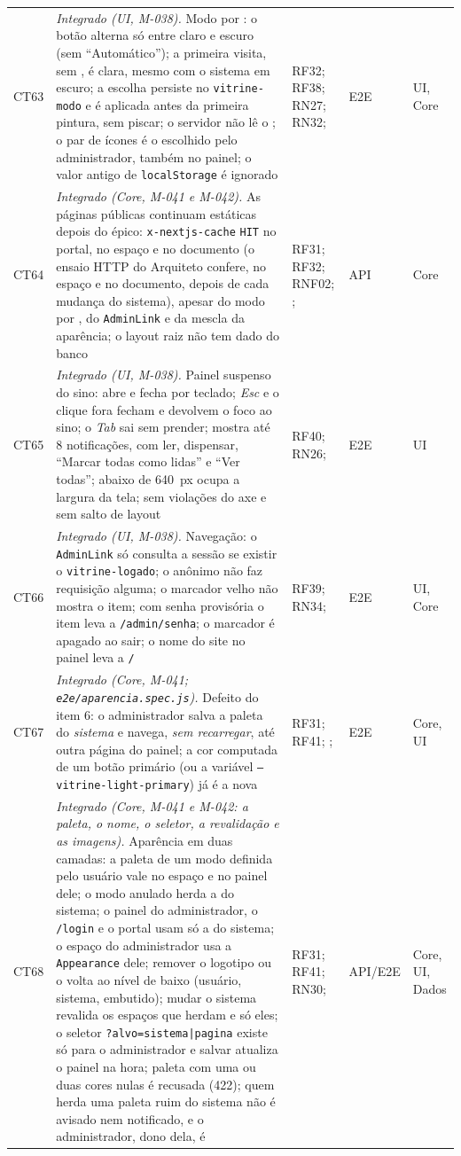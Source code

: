 \begin{longtable}{@{}L{1.1cm}L{7.0cm}L{2.2cm}L{1.6cm}L{1.6cm}@{}}
CT63 & \emph{Integrado (UI, M-038).} Modo por : o botão alterna só entre claro e escuro (sem ``Automático''); a primeira visita, sem , é clara, mesmo com o sistema em escuro; a escolha persiste no \texttt{vitrine-modo} e é aplicada antes da primeira pintura, sem piscar; o servidor não lê o ; o par de ícones é o escolhido pelo administrador, também no painel; o valor antigo de \texttt{localStorage} é ignorado & RF32; RF38; RN27; RN32;  & E2E & UI, Core\\[2pt]
CT64 & \emph{Integrado (Core, M-041 e M-042).} As páginas públicas continuam estáticas depois do épico: \texttt{x-nextjs-cache} \texttt{HIT} no portal, no espaço e no documento (o ensaio HTTP do Arquiteto confere, no espaço e no documento, depois de cada mudança do sistema), apesar do modo por , do \texttt{AdminLink} e da mescla da aparência; o layout raiz não tem dado do banco & RF31; RF32; RNF02; ;  & API & Core\\[2pt]
CT65 & \emph{Integrado (UI, M-038).} Painel suspenso do sino: abre e fecha por teclado; \emph{Esc} e o clique fora fecham e devolvem o foco ao sino; o \emph{Tab} sai sem prender; mostra até 8 notificações, com ler, dispensar, ``Marcar todas como lidas'' e ``Ver todas''; abaixo de 640~px ocupa a largura da tela; sem violações do axe e sem salto de layout & RF40; RN26;  & E2E & UI\\[2pt]
CT66 & \emph{Integrado (UI, M-038).} Navegação: o \texttt{AdminLink} só consulta a sessão se existir o \texttt{vitrine-logado}; o anônimo não faz requisição alguma; o marcador velho não mostra o item; com senha provisória o item leva a \texttt{/admin/senha}; o marcador é apagado ao sair; o nome do site no painel leva a \texttt{/} & RF39; RN34;  & E2E & UI, Core\\[2pt]
CT67 & \emph{Integrado (Core, M-041; \texttt{e2e/aparencia.spec.js}).} Defeito do item 6: o administrador salva a paleta do \emph{sistema} e navega, \emph{sem recarregar}, até outra página do painel; a cor computada de um botão primário (ou a variável \texttt{--vitrine-light-primary}) já é a nova & RF31; RF41; ;  & E2E & Core, UI\\[2pt]
CT68 & \emph{Integrado (Core, M-041 e M-042: a paleta, o nome, o seletor, a revalidação e as imagens).} Aparência em duas camadas: a paleta de um modo definida pelo usuário vale no espaço e no painel dele; o modo anulado herda a do sistema; o painel do administrador, o \texttt{/login} e o portal usam só a do sistema; o espaço do administrador usa a \texttt{Appearance} dele; remover o logotipo ou o  volta ao nível de baixo (usuário, sistema, embutido); mudar o sistema revalida os espaços que herdam e só eles; o seletor \texttt{?alvo=sistema|pagina} existe só para o administrador e salvar atualiza o painel na hora; paleta com uma ou duas cores nulas é recusada (422); quem herda uma paleta ruim do sistema não é avisado nem notificado, e o administrador, dono dela, é & RF31; RF41; RN30;  & API/E2E & Core, UI, Dados\\[2pt]

\end{longtable}

